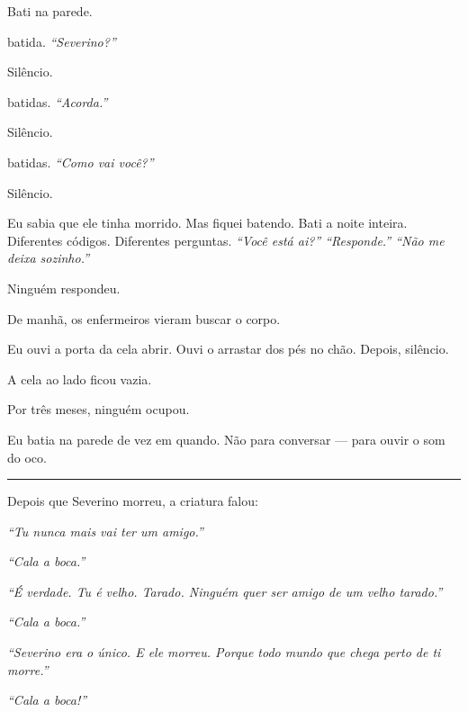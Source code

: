 \noindent Bati na parede.

 batida. \textit{\textquotedblleft{}Severino?\textquotedblright{}}

\noindent Silêncio.

 batidas. \textit{\textquotedblleft{}Acorda.\textquotedblright{}}

\noindent Silêncio.

 batidas. \textit{\textquotedblleft{}Como vai você?\textquotedblright{}}

\noindent Silêncio.

\noindent Eu sabia que ele tinha morrido. Mas fiquei batendo. Bati a noite inteira. Diferentes códigos. Diferentes perguntas. \textit{\textquotedblleft{}Você está ai?\textquotedblright{}\textit{ }\textquotedblleft{}Responde.\textquotedblright{}\textit{ }\textquotedblleft{}Não me deixa sozinho.\textquotedblright{}}

\noindent Ninguém respondeu.

\noindent De manhã, os enfermeiros vieram buscar o corpo.

\noindent Eu ouvi a porta da cela abrir. Ouvi o arrastar dos pés no chão. Depois, silêncio.

\noindent A cela ao lado ficou vazia.

\noindent Por três meses, ninguém ocupou.

\noindent Eu batia na parede de vez em quando. Não para conversar --- para ouvir o som do oco.

\vspace{0.5em}\noindent\rule{\textwidth}{0.5pt}\vspace{0.5em}

\noindent Depois que Severino morreu, a criatura falou:

\noindent \textit{\textquotedblleft{}Tu nunca mais vai ter um amigo.\textquotedblright{}}

\noindent \textit{\textquotedblleft{}Cala a boca.\textquotedblright{}}

\noindent \textit{\textquotedblleft{}É verdade. Tu é velho. Tarado. Ninguém quer ser amigo de um velho tarado.\textquotedblright{}}

\noindent \textit{\textquotedblleft{}Cala a boca.\textquotedblright{}}

\noindent \textit{\textquotedblleft{}Severino era o único. E ele morreu. Porque todo mundo que chega perto de ti morre.\textquotedblright{}}

\noindent \textit{\textquotedblleft{}Cala a boca!\textquotedblright{}}


